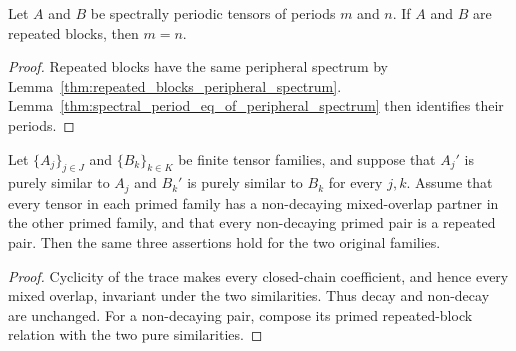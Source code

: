 \begin{lemma}
    \label{thm:repeated_blocks_period_eq}
    \leanok
    Let $A$ and $B$ be spectrally periodic tensors of periods $m$ and $n$.  If
    $A$ and $B$ are repeated blocks, then $m=n$.
\end{lemma}
\begin{proof}
    \leanok
    Repeated blocks have the same peripheral spectrum by
    Lemma~\ref{thm:repeated_blocks_peripheral_spectrum}.
    Lemma~\ref{thm:spectral_period_eq_of_peripheral_spectrum} then
    identifies their periods.
\end{proof}

\begin{lemma}
    \label{lem:periodic_overlap_hypothesis_gauge_transport}
    \leanok
    Let $\{A_j\}_{j\in J}$ and $\{B_k\}_{k\in K}$ be finite tensor
    families, and suppose that $A_j'$ is purely similar to $A_j$ and $B_k'$ is
    purely similar to $B_k$ for every $j,k$.  Assume that every tensor in each
    primed family has a non-decaying mixed-overlap partner in the other primed
    family, and that every non-decaying primed pair is a repeated pair.  Then
    the same three assertions hold for the two original families.
\end{lemma}
\begin{proof}
    \leanok
    Cyclicity of the trace makes every closed-chain coefficient, and hence
    every mixed overlap, invariant under the two similarities.  Thus decay and
    non-decay are unchanged.  For a non-decaying pair, compose its primed
    repeated-block relation with the two pure similarities.
\end{proof}

